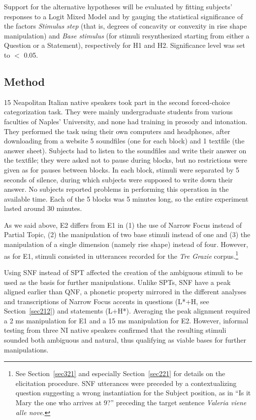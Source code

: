 Support for the alternative hypotheses will be evaluated by fitting subjects' responses to a Logit Mixed Model and by gauging the statistical significance of the factors \textit{Stimulus step} (that is, degrees of concavity or convexity in rise shape manipulation) and \textit{Base stimulus} (for stimuli resynthesized starting from either a Question or a Statement), respectively for H1 and H2. Significance level was set to $<$ 0.05.

\subsection{Method}\label{sec331}
15 Neapolitan Italian native speakers took part in the second forced-choice categorization task. They were mainly undergraduate students from various faculties of Naples' University, and none had training in prosody and intonation. They performed the task using their own computers and headphones, after downloading from a website 5 soundfiles (one for each block) and 1 textfile (the answer sheet).
Subjects had to listen to the soundfiles and write their answer on the textfile; they were asked not to pause during blocks, but no restrictions were given as for pauses between blocks. In each block, stimuli were separated by 5 seconds of silence, during which subjects were supposed to write down their answer. No subjects reported problems in performing this operation in the available time. Each of the 5 blocks was 5 minutes long, so the entire experiment lasted around 30 minutes. 

As we said above, E2 differs from E1 in (1) the use of Narrow Focus instead of Partial Topic, (2) the manipulation of two base stimuli instead of one and (3) the manipulation of a single dimension (namely rise shape) instead of four. However, as for E1, stimuli consisted in utterances recorded for the \textit{Tre Grazie} corpus.\footnote{See Section~\ref{sec321} and especially Section~\ref{sec221} for details on the elicitation procedure. SNF utterances were preceded by a contextualizing question suggesting a wrong instantiation for the Subject position, as in ``Is it Mary the one who arrives at 9?'' preceding the target sentence \textit{Valeria viene alle nove}.}

Using SNF instead of SPT affected the creation of the ambiguous stimuli to be used as the basis for further manipulations. Unlike SPTs, SNF have a peak aligned earlier than QNF, a phonetic property mirrored in the different analyses and transcriptions of Narrow Focus accents in questions (L*+H, see Section~\ref{sec212}) and statements (L+H*). Averaging the peak alignment required a 2 ms manipulation for E1 and a 15 ms manipulation for E2. However, informal testing from three NI native speakers confirmed that the resulting stimuli sounded both ambiguous and natural, thus qualifying as viable bases for further manipulations.

